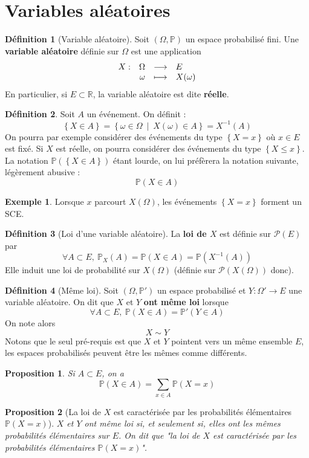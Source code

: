 \documentclass[french]{book}
\renewcommand{\P}{\mathbb{P}}
\newcommand{\R}{\mathbb{R}}
\newcommand{\tq}{\middle|}
\newcommand{\inv}{^{-1}}
\theoremstyle{plain}
\newtheorem{prop}{Proposition}[chapter]
\theoremstyle{definition}
\newtheorem{dfn}{Définition}[chapter]
\newtheorem{exa}{Exemple}[chapter]
\theoremstyle{remark}
\begin{document}
\section{Variables aléatoires}
\begin{dfn}[Variable aléatoire]
	Soit $(\Omega,\P)$ un espace probabilisé fini. Une \textbf{variable aléatoire} définie sur $\Omega$ est une application
	$$
	\begin{array}[t]{lrcl}
		X : & \Omega & \longrightarrow & E \\
		& \omega & \longmapsto & X(\omega)
	\end{array}
	$$ En particulier, si $E\subset\R$, la variable aléatoire est dite \textbf{réelle}.
\end{dfn}
\begin{dfn}
	Soit $A$ un événement.  On définit : $$\left\{X\in A\right\}=\left\{\omega\in\Omega \ \tq \ X(\omega)\in A\right\}=X\inv(A)$$ On pourra par exemple considérer des événements du type $\left\{X=x\right\}$ où $x\in E$ est fixé. Si $X$ est réelle, on pourra considérer des événements du type $\left\{X\leqslant x\right\}$. La notation $\P(\left\{X\in A\right\})$ étant lourde, on lui préfèrera la notation suivante, légèrement abusive : $$\P(X\in A)$$
\end{dfn}
\begin{exa}
	Lorsque $x$ parcourt $X(\Omega)$, les événements $\left\{X=x\right\}$ forment un SCE.
\end{exa}
\begin{dfn}[Loi d'une variable aléatoire]
	La \textbf{loi de $X$} est définie sur $\mathcal{P}(E)$ par $$\forall A\subset E, \ \P_X(A)=\P(X\in A)=\P(X\inv(A))$$ Elle induit une loi de probabilité sur $X(\Omega)$ (définie sur $\mathcal{P}(X(\Omega))$ donc).
\end{dfn}
\begin{dfn}[Même loi]
	Soit $(\Omega,\P')$ un espace probabilisé et $Y:\Omega'\rightarrow E$ une variable aléatoire. On dit que $X$ et $Y$ \textbf{ont même loi} lorsque $$\forall A\subset E, \ \P(X\in A)=\P'(Y\in A)$$ On note alors $$X\sim Y$$Notons que le seul pré-requis est que $X$ et $Y$ pointent vers un même ensemble $E$, les espaces probabilisés peuvent être les mêmes comme différents.
\end{dfn}
\begin{prop}
	Si $A\subset E$, on a $$\P(X\in A)=\sum_{x\in A}\P(X=x)$$
\end{prop}
\begin{prop}[La loi de $X$ est caractérisée par les probabilités élémentaires $\P(X=x)$]
	$X$ et $Y$ ont même loi si, et seulement si, elles ont les mêmes probabilités élémentaires sur $E$. On dit que "la loi de $X$ est caractérisée par les probabilités élémentaires $\P(X=x)$".
\end{prop}
\end{document}
